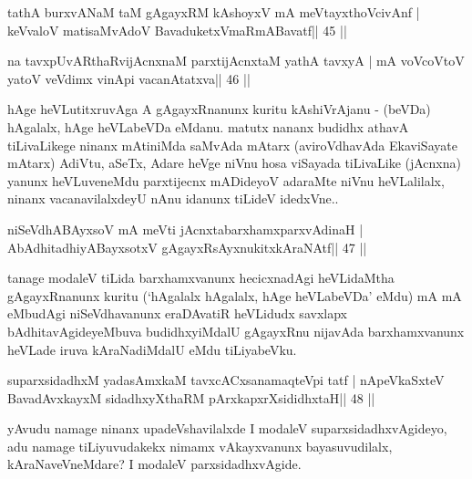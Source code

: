 \begin{shl}
tathA burxvANaM taM gAgayxRM kAshoyxV mA meVtayxthoVcivAnf |
keVvaloV matisaMvAdoV BavaduketxVmaRmABavatf\hfill || 45 ||
\end{shl}

\begin{shl}
na tavxpUvARthaRvijAcnxnaM parxtijAcnxtaM yathA tavxyA |
mA voVcoV\s toV yatoV veVdimx vinA\s pi vacanAtatxva\hfill || 46 ||
\end{shl}

\begin{artha}
hAge heVLutitxruvAga A gAgayxRnanunx kuritu kAshiVrAjanu - (beVDa)  hAgalalx, hAge heVLabeVDa eMdanu. matutx nananx budidhx athavA  tiLivaLikege ninanx mAtiniMda saMvAda mAtarx (aviroVdhavAda EkaviSayate mAtarx) AdiVtu, aSeTx, Adare heVge niVnu hosa viSayada tiLivaLike (jAcnxna) yanunx heVLuveneMdu parxtijecnx mADideyoV adaraMte niVnu heVLalilalx, ninanx vacanavilalxdeyU nAnu idanunx tiLideV idedxVne..
\end{artha}


\begin{shl}
niSeVdhABAyxsoV mA meVti jAcnxtabarxhamxparxvAdinaH |
AbAdhitadhiyA\s BayxsotxV gAgayxRsAyxnukitxkAraNAtf\hfill || 47 ||
\end{shl}

\begin{artha}
tanage modaleV  tiLida barxhamxvanunx hecicxnadAgi heVLidaMtha  gAgayxRnanunx kuritu (`hAgalalx hAgalalx, hAge heVLabeVDa' eMdu) mA mA  eMbudAgi niSeVdhavanunx eraDAvatiR heVLidudx savxlapx  bAdhitavAgideyeMbuva budidhxyiMdalU gAgayxRnu nijavAda barxhamxvanunx heVLade iruva kAraNadiMdalU eMdu tiLiyabeVku.
\end{artha}


\begin{shl}
suparxsidadhxM yadasAmxkaM tavxcACxsanamaqteV\s pi tatf |
nApeVkaSxteV BavadAvxkayxM sidadhxyXthaRM pArxkapxrXsididhxtaH\hfill || 48 ||
\end{shl}

\begin{artha}
yAvudu namage ninanx upadeVshavilalxde I modaleV suparxsidadhxvAgideyo,  adu namage tiLiyuvudakekx nimamx vAkayxvanunx bayasuvudilalx, kAraNaveVneMdare? I modaleV parxsidadhxvAgide.
\end{artha}

